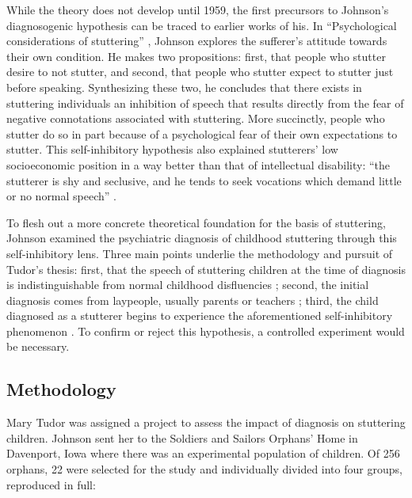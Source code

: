 \documentclass{../../../coursework}
\begin{document}
While the theory does not develop until 1959, the first precursors to
Johnson's diagnosogenic hypothesis can be traced to earlier works of
his. In ``Psychological considerations of stuttering'' \parencite*{Joh36}, Johnson
explores the sufferer's attitude towards their own condition. He makes
two propositions: first, that people who stutter desire to not stutter,
and second, that people who stutter expect to stutter just before
speaking. Synthesizing these two, he concludes that there exists in
stuttering individuals an inhibition of speech that results directly
from the fear of negative connotations associated with stuttering. More
succinctly, people who stutter do so in part because of a psychological
fear of their own expectations to stutter. This self-inhibitory
hypothesis also explained stutterers' low socioeconomic position in a
way better than that of intellectual disability: ``the stutterer is shy
and seclusive, and he tends to seek vocations which demand little or no
normal speech'' \parencite[23]{Joh36}.

To flesh out a more concrete theoretical foundation for the basis of
stuttering, Johnson examined the psychiatric diagnosis of childhood
stuttering through this self-inhibitory lens. Three main points underlie
the methodology and pursuit of Tudor's thesis: first, that the speech of
stuttering children at the time of diagnosis is indistinguishable from
normal childhood disfluencies \parencite{GoldfarbEthics02}; second, the initial
diagnosis comes from laypeople, usually parents or teachers \parencite{Joh42};
third, the child diagnosed as a stutterer begins to experience
the aforementioned self-inhibitory phenomenon \parencite{Joh36}. To
confirm or reject this hypothesis, a controlled experiment would be
necessary.

\subsection{Methodology}

Mary Tudor was assigned a project to assess the impact of diagnosis on
stuttering children. Johnson sent her to the Soldiers and Sailors
Orphans' Home in Davenport, Iowa where there was an experimental
population of children. Of 256 orphans, 22 were selected for the study
and individually divided into four groups, reproduced in full:
\end{document}
